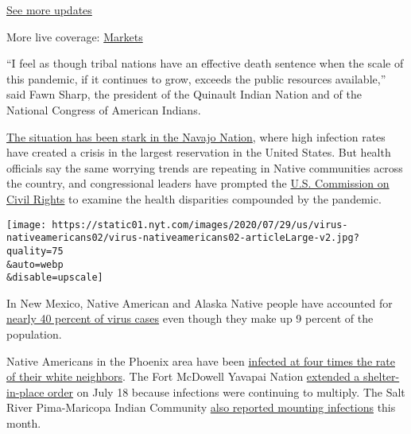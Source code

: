 \href{https://www.nytimes.com/2020/08/01/world/coronavirus-covid-19.html?action=click\&pgtype=Article\&state=default\&region=MAIN_CONTENT_1\&context=storylines_live_updates}{See
more updates}

More live coverage:
\href{https://www.nytimes.com/live/2020/07/31/business/stock-market-today-coronavirus?action=click\&pgtype=Article\&state=default\&region=MAIN_CONTENT_1\&context=storylines_live_updates}{Markets}

``I feel as though tribal nations have an effective death sentence when
the scale of this pandemic, if it continues to grow, exceeds the public
resources available,'' said Fawn Sharp, the president of the Quinault
Indian Nation and of the National Congress of American Indians.

\href{https://www.nytimes.com/2020/04/09/us/coronavirus-navajo-nation.html}{The
situation has been stark in the Navajo Nation}, where high infection
rates have created a crisis in the largest reservation in the United
States. But health officials say the same worrying trends are repeating
in Native communities across the country, and congressional leaders have
prompted the
\href{https://www.warren.senate.gov/newsroom/press-releases/us-commission-on-civil-rights-agrees-to-warren-haaland-request-to-update-broken-promises-report-and-examine-pandemic-impacts-on-indian-country}{U.S.
Commission on Civil Rights} to examine the health disparities compounded
by the pandemic.

\texttt{[image: https://static01.nyt.com/images/2020/07/29/us/virus-nativeamericans02/virus-nativeamericans02-articleLarge-v2.jpg?quality=75\\\&auto=webp\\\&disable=upscale]}

In New Mexico, Native American and Alaska Native people have accounted
for \href{https://cvprovider.nmhealth.org/public-dashboard.html}{nearly
40 percent of virus cases} even though they make up 9 percent of the
population.

Native Americans in the Phoenix area have been
\href{https://phdata.maricopa.gov/Dashboard/e10a16d8-921f-4aac-b921-26d95e638a45?e=false\&vo=viewonly}{infected
at four times the rate of their white neighbors}. The Fort McDowell
Yavapai Nation
\href{https://www.fmyn.org/tribal-member-letter-extending-shelter-in-place-order-and-tribal-govt-closure/}{extended
a shelter-in-place order} on July 18 because infections were continuing
to multiply. The Salt River Pima-Maricopa Indian Community
\href{https://oan.srpmic-nsn.gov/archives/2020/PDFs/OAN_JULY162020_FINAL.pdf}{also
reported mounting infections} this month.


